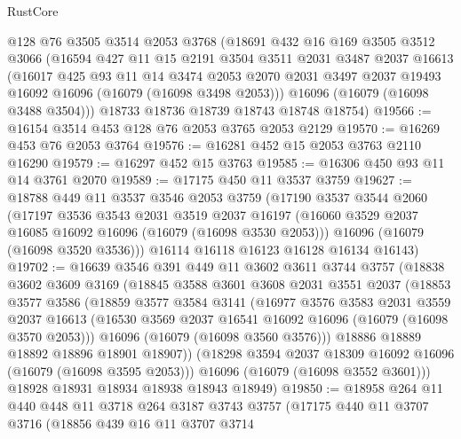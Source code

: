 \begin{lexlean}{RustCore}
\begin{coremodule}
    @128
    @76
    @3505
    @3514
    @2053
    @3768
    (@18691
      @432
      @16
      @169
      @3505
      @3512
      @3066
      (@16594
        @427
        @11
        @15
        @2191
        @3504
        @3511
        @2031
        @3487
        @2037
        @16613
        (@16017
          @425
          @93
          @11
          @14
          @3474
          @2053
          @2070
          @2031
          @3497
          @2037
          @19493
          @16092
          @16096
          (@16079 (@16098 @3498 @2053)))
        @16096
        (@16079 (@16098 @3488 @3504)))
      @18733
      @18736
      @18739
      @18743
      @18748
      @18754)
@19566 := @16154 @3514 @453 @128 @76 @2053 @3765 @2053 @2129
@19570 := @16269 @453 @76 @2053 @3764
@19576 := @16281 @452 @15 @2053 @3763 @2110 @16290
@19579 := @16297 @452 @15 @3763
@19585 := @16306 @450 @93 @11 @14 @3761 @2070
@19589 := @17175 @450 @11 @3537 @3759
@19627 := @18788
    @449
    @11
    @3537
    @3546
    @2053
    @3759
    (@17190
      @3537
      @3544
      @2060
      (@17197
        @3536
        @3543
        @2031
        @3519
        @2037
        @16197
        (@16060 @3529 @2037 @16085 @16092 @16096 (@16079 (@16098 @3530 @2053)))
        @16096
        (@16079 (@16098 @3520 @3536)))
      @16114
      @16118
      @16123
      @16128
      @16134
      @16143)
@19702 := @16639
    @3546
    @391
    @449
    @11
    @3602
    @3611
    @3744
    @3757
    (@18838
      @3602
      @3609
      @3169
      (@18845
        @3588
        @3601
        @3608
        @2031
        @3551
        @2037
        (@18853
          @3577
          @3586
          (@18859
            @3577
            @3584
            @3141
            (@16977
              @3576
              @3583
              @2031
              @3559
              @2037
              @16613
              (@16530 @3569 @2037 @16541 @16092 @16096 (@16079 (@16098 @3570 @2053)))
              @16096
              (@16079 (@16098 @3560 @3576)))
            @18886
            @18889
            @18892
            @18896
            @18901
            @18907))
        (@18298 @3594 @2037 @18309 @16092 @16096 (@16079 (@16098 @3595 @2053)))
        @16096
        (@16079 (@16098 @3552 @3601)))
      @18928
      @18931
      @18934
      @18938
      @18943
      @18949)
@19850 := @18958
    @264
    @11
    @440
    @448
    @11
    @3718
    @264
    @3187
    @3743
    @3757
    (@17175
      @440
      @11
      @3707
      @3716
      (@18856
        @439
        @16
        @11
        @3707
        @3714

\end{coremodule}
\end{lexlean}
